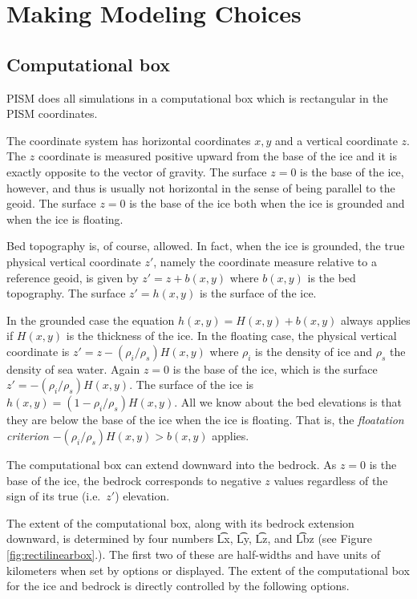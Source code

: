 
\section{Making Modeling Choices}
\label{sec:modeling-choices}

\subsection{Computational box} \label{subsect:coords}

PISM does all simulations in a computational box which is rectangular in the PISM coordinates.

The coordinate system has horizontal coordinates $x,y$ and a vertical coordinate $z$.  The $z$ coordinate is measured positive upward from the base of the ice and it is exactly opposite to the vector of gravity.  The surface $z=0$ is the base of the ice, however, and thus is usually not horizontal in the sense of being parallel to the geoid.   The surface $z=0$ is the base of the ice both when the ice is grounded and when the ice is floating.

Bed topography is, of course, allowed.  In fact, when the ice is grounded, the true physical vertical coordinate $z'$, namely the coordinate measure relative to a reference geoid, is given by $z'=z+b(x,y)$ where $b(x,y)$ is the bed topography.  The surface $z'=h(x,y)$ is the surface of the ice.

In the grounded case the equation $h(x,y)=H(x,y)+b(x,y)$ always applies if $H(x,y)$ is the thickness of the ice.  In the floating case, the physical vertical coordinate is $z'=z-(\rho_i/\rho_s) H(x,y)$ where $\rho_i$ is the density of ice and $\rho_s$ the density of sea water.  Again $z=0$ is the base of the ice, which is the surface $z' = -(\rho_i/\rho_s) H(x,y)$.  The surface of the ice is $h(x,y) = (1-\rho_i/\rho_s) H(x,y)$.  All we know about the bed elevations is that they are below the base of the ice when the ice is floating.  That is, the \emph{floatation criterion} $-(\rho_i/\rho_s) H(x,y) > b(x,y)$ applies.

The computational box can extend downward into the bedrock.  As $z=0$ is the base of the ice, the bedrock corresponds to negative $z$ values regardless of the sign of its true (i.e.~$z'$) elevation.

The extent of the computational box, along with its bedrock extension downward, is determined by four numbers \t{Lx}, \t{Ly}, \t{Lz}, and \t{Lbz} (see Figure \ref{fig:rectilinearbox}.).  The first two of these are half-widths and have units of kilometers when set by options or displayed.  The extent of the computational box for the ice and bedrock is directly controlled by the following options. 

